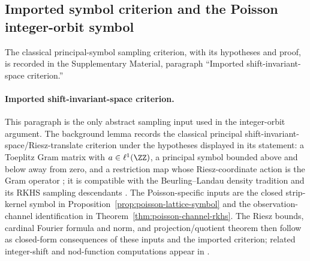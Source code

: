 
\subsection{Imported symbol criterion and the Poisson integer-orbit symbol}%
\label{subsec:lattice-background-poisson-symbol}

\ifdefined\JFAArticleMain
The classical principal-symbol sampling criterion, with its hypotheses and
proof, is recorded in the Supplementary Material, paragraph
``Imported shift-invariant-space criterion.''
\label{lem:imported-principal-symbol-sampling}
\else
\paragraph{Imported shift-invariant-space criterion.}
This paragraph is the only abstract sampling input used in the integer-orbit
argument.  The background lemma records the classical principal
shift-invariant-space/Riesz-translate criterion under the hypotheses displayed
in its statement: a Toeplitz Gram matrix with $a\in\ell^1(\ZZ)$, a principal
symbol bounded above and below away from zero, and a restriction map whose
Riesz-coordinate action is the Gram operator
\cite{deBoorDeVoreRon1994,RonShen1995,Bownik2000,AldroubiGrochenig2001}; it is
compatible with the Beurling--Landau density tradition and its RKHS sampling
descendants
\cite{Beurling1989,Landau1967,Seip1992,NashedWalter1991,NashedSun2010,ChengJiangSun2016,FuhrGrochenigHaimiKlotzRomero2018}.
The Poisson-specific
inputs are the closed strip-kernel symbol in
Proposition~\ref{prop:poisson-lattice-symbol} and the observation-channel
identification in Theorem~\ref{thm:poisson-channel-rkhs}.  The Riesz bounds,
cardinal Fourier formula and norm, and projection/quotient theorem then follow
as closed-form consequences of these inputs and the imported criterion; related
integer-shift and nod-function computations appear in
\cite{KiselevMininNovikov2016,KiselevMininNovikov2019}.

